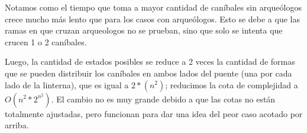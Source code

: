   Notamos como el tiempo que toma a mayor cantidad de caníbales sin arqueólogos crece mucho más lento que para los casos con arqueólogos. Esto se debe a que las ramas en que cruzan arqueologos no se prueban, sino que solo se intenta que crucen 1 o 2 caníbales.


   Luego, la cantidad de estados posibles se reduce a 2 veces la cantidad de formas que se pueden distribuir los caníbales en ambos lados del puente (una por cada lado de la linterna), que es igual a $2*(n^2)$; reducimos la cota de complejidad a $O(n^2*2^{n^2})$. El cambio no es muy grande debido a que las cotas no están totalmente ajustadas, pero funcionan para dar una idea del peor caso acotado por arriba.
